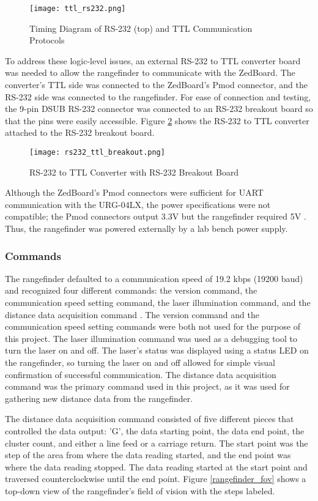 \begin{figure}[H]
	\centerline{\texttt{[image: ttl\_rs232.png]}}
	\caption{Timing Diagram of RS-232 (top) and TTL Communication Protocols \cite{ttl}}
	\label{ttl_rs232_pic}
\end{figure}

To address these logic-level issues, an external RS-232 to TTL converter board was needed to allow the rangefinder to communicate with the ZedBoard. The converter's TTL side was connected to the ZedBoard's Pmod connector, and the RS-232 side was connected to the rangefinder. For ease of connection and testing, the 9-pin DSUB RS-232 connector was connected to an RS-232 breakout board so that the pins were easily accessible. Figure \ref{rs232_ttl_breakout} shows the RS-232 to TTL converter attached to the RS-232 breakout board.

\begin{figure}[H]
	\centerline{\texttt{[image: rs232\_ttl\_breakout.png]}}
	\caption{RS-232 to TTL Converter with RS-232 Breakout Board}
	\label{rs232_ttl_breakout}
\end{figure}

Although the ZedBoard's Pmod connectors were sufficient for UART communication with the URG-04LX, the power specifications were not compatible; the Pmod connectors output 3.3V but the rangefinder required 5V \cite{zedboard_datasheet, urg04lx_specifications}. Thus, the rangefinder was powered externally by a lab bench power supply.

\subsubsection{Commands}
The rangefinder defaulted to a communication speed of 19.2 kbps (19200 baud) and recognized four different commands: the version command, the communication speed setting command, the laser illumination command, and the distance data acquisition command \cite{urg04lx_datasheet}. The version command and the communication speed setting commands were both not used for the purpose of this project. The laser illumination command was used as a debugging tool to turn the laser on and off. The laser's status was displayed using a status LED on the rangefinder, so turning the laser on and off allowed for simple visual confirmation of successful communication. The distance data acquisition command was the primary command used in this project, as it was used for gathering new distance data from the rangefinder.
\par
The distance data acquisition command consisted of five different pieces that controlled the data output: 'G', the data starting point, the data end point, the cluster count, and either a line feed or a carriage return. The start point was the step of the area from where the data reading started, and the end point was where the data reading stopped. The data reading started at the start point and traversed counterclockwise until the end point. Figure \ref{rangefinder_fov} shows a top-down view of the rangefinder's field of vision with the steps labeled.

